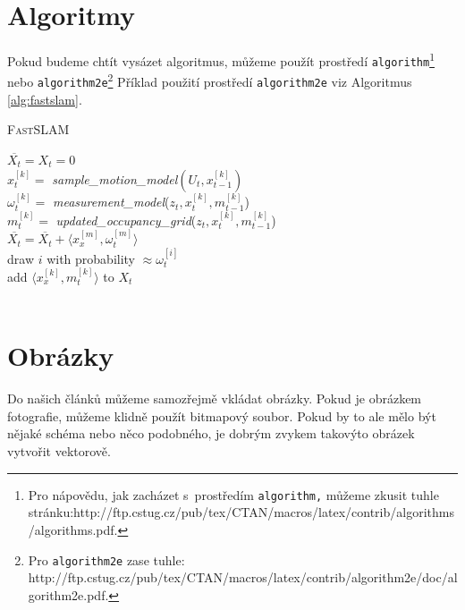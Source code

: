 \documentclass[11pt,a4paper]{article}
\begin{document}
\section{Algoritmy} \label{sec:algoritmy}
Pokud budeme chtít vysázet algoritmus, můžeme použít prostředí \texttt{algorithm}\footnote{Pro nápovědu, jak zacházet s~prostředím \texttt{algorithm,} můžeme zkusit tuhle stránku:\newline http://ftp.cstug.cz/pub/tex/CTAN/macros/latex/contrib/algorithms/algorithms.pdf.} nebo \texttt{algorithm2e}\footnote{Pro \texttt{algorithm2e} zase tuhle: http://ftp.cstug.cz/pub/tex/CTAN/macros/latex/contrib/algorithm2e/doc/algorithm2e.pdf.} Příklad použití prostředí \texttt{algorithm2e} viz Algoritmus \ref{alg:fastslam}.

\bigskip
{}
\begin{algorithm}[H]
\caption{\textsc{Fast}SLAM}
\label{alg:fastslam}
\SetNlSty{}{}{:  }
\SetInd{1em}{1em}
\SetNlSkip{-1.33em}
\BlankLine
\Indp \Indp
	$\overline{X_t} = X_t = 0$ \\
	{
	$x_t^{[k]} =$ \emph{sample\_motion\_model}$(U_t, x_{t-1}^{[k]})$\\
		$\omega_t^{[k]} = $ \emph{measurement\_model}($z_t, x_t^{[k]}, m_{t-1}^{[k]}$) \\
		$m_t^{[k]} = $ \emph{updated\_occupancy\_grid}($z_t, x_t^{[k]}, m_{t-1}^{[k]}$) \\
		$\overline{X_t} = \overline{X_t} + \langle x_x^{[m]}, \omega_t^{[m]}\rangle$ \\
	}
	{
		draw $i$ with probability $\approx \omega_t^{[i]}$ \\
		add $\langle x_x^{[k]}, m_t^{[k]}\rangle$ to $X_t$ \\
	}
	 \\
		
\end{algorithm}
\bigskip

\section{Obrázky}
Do našich článků můžeme samozřejmě vkládat obrázky. Pokud je obrázkem fotografie, můžeme klidně použít bitmapový soubor. Pokud by to ale mělo být nějaké schéma nebo něco podobného, je dobrým zvykem takovýto obrázek vytvořit vektorově.
\end{document}
